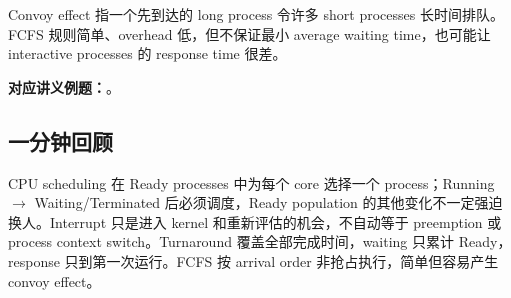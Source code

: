 Convoy effect 指一个先到达的 long process 令许多 short processes 长时间排队。FCFS 规则简单、overhead 低，但不保证最小 average waiting time，也可能让 interactive processes 的 response time 很差。

\textbf{对应讲义例题：}。

\subsection{一分钟回顾}

CPU scheduling 在 Ready processes 中为每个 core 选择一个 process；Running $\rightarrow$ Waiting/Terminated 后必须调度，Ready population 的其他变化不一定强迫换人。Interrupt 只是进入 kernel 和重新评估的机会，不自动等于 preemption 或 process context switch。Turnaround 覆盖全部完成时间，waiting 只累计 Ready，response 只到第一次运行。FCFS 按 arrival order 非抢占执行，简单但容易产生 convoy effect。

